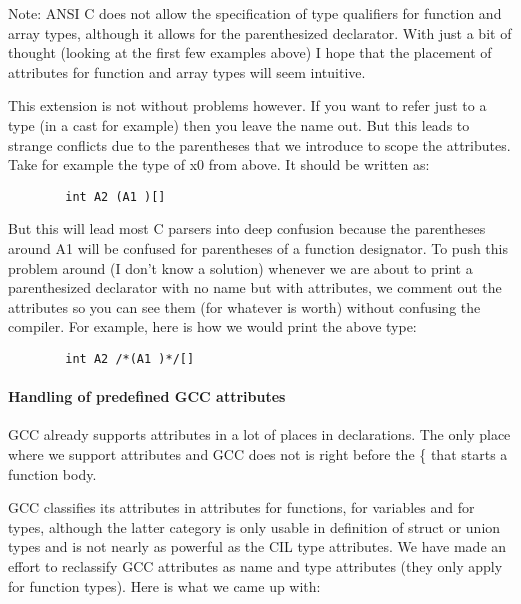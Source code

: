 \documentclass{article}
\begin{document}
 Note: ANSI C does not allow the specification of type qualifiers for function
and array types, although it allows for the parenthesized declarator. With
just a bit of thought (looking at the first few examples above) I hope that
the placement of attributes for function and array types will seem intuitive.

 This extension is not without problems however. If you want to refer just to
a type (in a cast for example) then you leave the name out. But this leads to
strange conflicts due to the parentheses that we introduce to scope the
attributes. Take for example the type of x0 from above. It should be written
as: 
 
\begin{verbatim}
        int A2 (A1 )[]
\end{verbatim}

 But this will lead most C parsers into deep confusion because the parentheses
around A1 will be confused for parentheses of a function designator. To push
this problem around (I don't know a solution) whenever we are about to print a
parenthesized declarator with no name but with attributes, we comment out the
attributes so you can see them (for whatever is worth) without confusing the
compiler. For example, here is how we would print the above type:

\begin{verbatim}
        int A2 /*(A1 )*/[]
\end{verbatim}

 \paragraph{Handling of predefined GCC attributes}

 GCC already supports attributes in a lot of places in declarations. The only
place where we support attributes and GCC does not is right before the \{ that
starts a function body. 

 GCC classifies its attributes in attributes for functions, for variables and
for types, although the latter category is only usable in definition of struct
or union types and is not nearly as powerful as the CIL type attributes. We
have made an effort to reclassify GCC attributes as name and type attributes
(they only apply for function types). Here is what we came up with:
\end{document}
